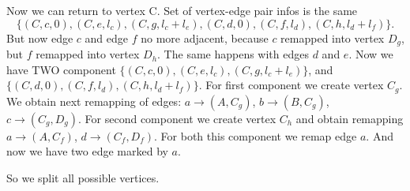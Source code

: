 \documentclass[12pt,a4paper,oneside]{article}
\begin{document}
Now we can return to vertex C. Set of vertex-edge pair infos is the
same $$\{(C,c,0), (C,e,l_c), (C,g,l_c+l_e), (C,d,0), (C,f,l_d),
(C,h,l_d+l_f)\}.$$
But now edge $c$ and edge $f$ no more adjacent, because $c$ remapped into
vertex $D_g$, but $f$ remapped into vertex $D_h$. The same happens with edges
$d$ and $e$. Now we have TWO component $\{(C,c,0), (C,e,l_c),
(C,g,l_c+l_e)\}$, and $\{(C,d,0), (C,f,l_d), (C,h,l_d+l_f)\}$. For first
component we create vertex $C_g$. We obtain next remapping of edges: $a
\rightarrow (A, C_g)$, $b \rightarrow (B, C_g)$, $c \rightarrow (C_g, D_g)$.
For second component we create vertex $C_h$ and obtain remapping $a \rightarrow
(A, C_f)$, $d \rightarrow (C_f, D_f)$. For both this component we remap edge $a$.
And now we have two edge marked by $a$.

So we split all possible vertices.
\end{document}

